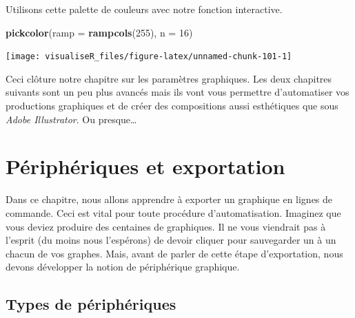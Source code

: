 \documentclass[]{article}
\newenvironment{Shaded}{\begin{snugshade}}{\end{snugshade}}
\newcommand{\DataTypeTok}[1]{\textcolor[rgb]{0.13,0.29,0.53}{#1}}
\newcommand{\DecValTok}[1]{\textcolor[rgb]{0.00,0.00,0.81}{#1}}
\newcommand{\KeywordTok}[1]{\textcolor[rgb]{0.13,0.29,0.53}{\textbf{#1}}}
\newcommand{\NormalTok}[1]{#1}
\begin{document}
Utilisons cette palette de couleurs avec notre fonction interactive.

\begin{Shaded}
\begin{Highlighting}[]
\KeywordTok{pickcolor}\NormalTok{(}\DataTypeTok{ramp =} \KeywordTok{rampcols}\NormalTok{(}\DecValTok{255}\NormalTok{), }\DataTypeTok{n =} \DecValTok{16}\NormalTok{)}
\end{Highlighting}
\end{Shaded}

\begin{center}\texttt{[image: visualiseR\_files/figure-latex/unnamed-chunk-101-1]} \end{center}

Ceci clôture notre chapitre sur les paramètres graphiques. Les deux chapitres suivants sont un peu plus avancés mais ils vont vous permettre d'automatiser vos productions graphiques et de créer des compositions aussi esthétiques que sous \emph{Adobe Illustrator}. Ou presque\ldots{}

\hypertarget{puxe9riphuxe9riques-et-exportation}{%
\section{Périphériques et exportation}\label{puxe9riphuxe9riques-et-exportation}}

Dans ce chapitre, nous allons apprendre à exporter un graphique en lignes de commande. Ceci est vital pour toute procédure d'automatisation. Imaginez que vous deviez produire des centaines de graphiques. Il ne vous viendrait pas à l'esprit (du moins nous l'espérons) de devoir cliquer pour sauvegarder un à un chacun de vos graphes. Mais, avant de parler de cette étape d'exportation, nous devons développer la notion de périphérique graphique.

\hypertarget{types-de-puxe9riphuxe9riques}{%
\subsection{Types de périphériques}\label{types-de-puxe9riphuxe9riques}}
\end{document}
